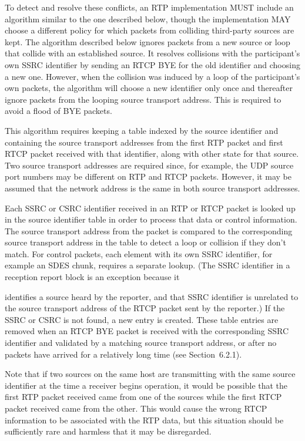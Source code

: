 \documentclass{article}
\begin{document}
\begin{itemize}
To detect and resolve these conflicts, an RTP implementation MUST include an algorithm similar to the one described below, though the implementation MAY choose a different policy for which packets from colliding third-party sources are kept.  The algorithm described below ignores packets from a new source or loop that collide with an established source.  It resolves collisions with the participant's own SSRC identifier by sending an RTCP BYE for the old identifier and choosing a new one.  However, when the collision was induced by a loop of the participant's own packets, the algorithm will choose a new identifier only once and thereafter ignore packets from the looping source transport address.  This is required to avoid a flood of BYE packets.

This algorithm requires keeping a table indexed by the source identifier and containing the source transport addresses from the first RTP packet and first RTCP packet received with that identifier, along with other state for that source.  Two source transport addresses are required since, for example, the UDP source port numbers may be different on RTP and RTCP packets.  However, it may be assumed that the network address is the same in both source transport addresses.

Each SSRC or CSRC identifier received in an RTP or RTCP packet is looked up in the source identifier table in order to process that data or control information.  The source transport address from the packet is compared to the corresponding source transport address in the table to detect a loop or collision if they don't match.  For control packets, each element with its own SSRC identifier, for example an SDES chunk, requires a separate lookup.  (The SSRC identifier in a reception report block is an exception because it

identifies a source heard by the reporter, and that SSRC identifier is unrelated to the source transport address of the RTCP packet sent by the reporter.)  If the SSRC or CSRC is not found, a new entry is created.  These table entries are removed when an RTCP BYE packet is received with the corresponding SSRC identifier and validated by a matching source transport address, or after no packets have arrived for a relatively long time (see Section~6.2.1).

Note that if two sources on the same host are transmitting with the same source identifier at the time a receiver begins operation, it would be possible that the first RTP packet received came from one of the sources while the first RTCP packet received came from the other. This would cause the wrong RTCP information to be associated with the RTP data, but this situation should be sufficiently rare and harmless that it may be disregarded.


\end{itemize}
\end{document}

